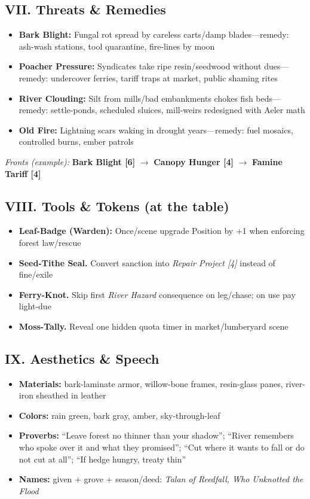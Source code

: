 \documentclass[11pt]{book}
\begin{document}
\subsection{VII. Threats \& Remedies}
\begin{itemize}
    \item \textbf{Bark Blight:} Fungal rot spread by careless carts/damp blades---remedy: ash-wash stations, tool quarantine, fire-lines by moon
    \item \textbf{Poacher Pressure:} Syndicates take ripe resin/seedwood without dues---remedy: undercover ferries, tariff traps at market, public shaming rites
    \item \textbf{River Clouding:} Silt from mills/bad embankments chokes fish beds---remedy: settle-ponds, scheduled sluices, mill-weirs redesigned with Aeler math
    \item \textbf{Old Fire:} Lightning scars waking in drought years---remedy: fuel mosaics, controlled burns, ember patrols
\end{itemize}
\textit{Fronts (example):} \textbf{Bark Blight [6]} $\rightarrow$ \textbf{Canopy Hunger [4]} $\rightarrow$ \textbf{Famine Tariff [4]}

\subsection{VIII. Tools \& Tokens (at the table)}
\begin{itemize}
    \item \textbf{Leaf-Badge (Warden):} Once/scene upgrade Position by +1 when enforcing forest law/rescue
    \item \textbf{Seed-Tithe Seal.} Convert sanction into \emph{Repair Project [4]} instead of fine/exile
    \item \textbf{Ferry-Knot.} Skip first \emph{River Hazard} consequence on leg/chase; on use pay light-due
    \item \textbf{Moss-Tally.} Reveal one hidden quota timer in market/lumberyard scene
\end{itemize}

\subsection{IX. Aesthetics \& Speech}
\begin{itemize}
    \item \textbf{Materials:} bark-laminate armor, willow-bone frames, resin-glass panes, river-iron sheathed in leather
    \item \textbf{Colors:} rain green, bark gray, amber, sky-through-leaf
    \item \textbf{Proverbs:} ``Leave forest no thinner than your shadow''; ``River remembers who spoke over it and what they promised''; ``Cut where it wants to fall or do not cut at all''; ``If hedge hungry, treaty thin''
    \item \textbf{Names:} given + grove + season/deed: \emph{Talan of Reedfall, Who Unknotted the Flood}
\end{itemize}
\end{document}
